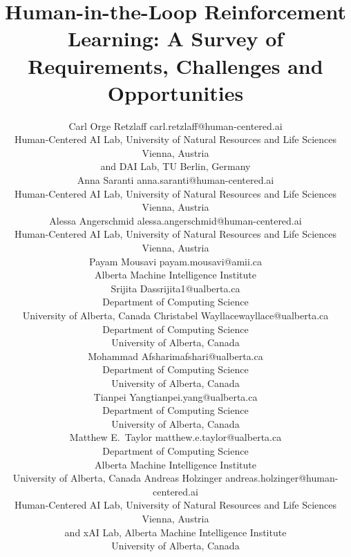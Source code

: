 \documentclass[twoside,11pt]{article}
\begin{document}
\title{Human-in-the-Loop Reinforcement Learning: A Survey of Requirements, Challenges and Opportunities}

\author{\name Carl Orge Retzlaff \email carl.retzlaff@human-centered.ai\\ 
\addr Human-Centered AI Lab, University of Natural Resources and Life Sciences Vienna, Austria\\
and DAI Lab, TU Berlin, Germany\\
\AND
\name Anna Saranti \email anna.saranti@human-centered.ai \\
\addr Human-Centered AI Lab, University of Natural Resources and Life Sciences Vienna, Austria\\
\AND
\name Alessa Angerschmid \email alessa.angerschmid@human-centered.ai \\
\addr Human-Centered AI Lab, University of Natural Resources and Life Sciences Vienna, Austria\\
\AND
\name Payam Mousavi \email payam.mousavi@amii.ca \\
\addr Alberta Machine Intelligence Institute\\
\AND
\name Srijita Das\email srijita1@ualberta.ca \\
\addr Department of Computing Science \\ 
University of Alberta, Canada
\AND
\name Christabel Wayllace\email wayllace@ualberta.ca \\
\addr Department of Computing Science \\ University of Alberta, Canada\\
\AND
\name Mohammad Afshari\email mafshari@ualberta.ca \\
\addr Department of Computing Science \\ University of Alberta, Canada\\
\AND
\name Tianpei Yang\email tianpei.yang@ualberta.ca \\
\addr Department of Computing Science \\ University of Alberta, Canada\\
\AND
\name Matthew E.~Taylor \email matthew.e.taylor@ualberta.ca \\
\addr Department of Computing Science\\
Alberta Machine Intelligence Institute\\
University of Alberta, Canada
\AND
\name Andreas Holzinger \email andreas.holzinger@human-centered.ai \\
\addr Human-Centered AI Lab, University of Natural Resources and Life Sciences Vienna, Austria \\
and xAI Lab, Alberta Machine Intelligence Institute\\
University of Alberta, Canada
}
\end{document}

